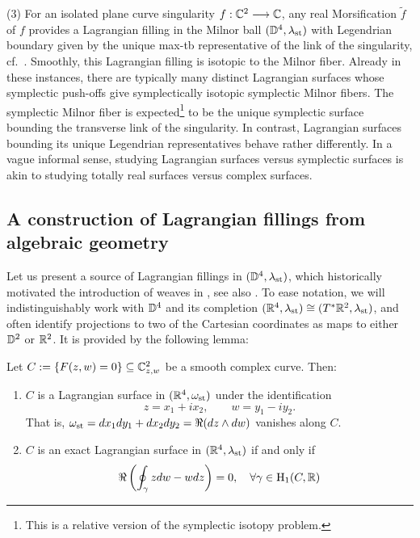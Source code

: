 \begin{example}
\noindent (3) For an isolated plane curve singularity $f:\mathbb{C}^2\longrightarrow\mathbb{C}$, any real Morsification $\tilde{f}$ of $f$ provides a Lagrangian filling in the Milnor ball $(\mathbb{D}^4,\lambda_{\text{st}})$ with Legendrian boundary given by the unique max-tb representative of the link of the singularity, cf.~\cite[Section 2]{CasalsLagSkel}. Smoothly, this Lagrangian filling is isotopic to the Milnor fiber. Already in these instances, there are typically many distinct Lagrangian surfaces whose symplectic push-offs give symplectically isotopic symplectic Milnor fibers. The symplectic Milnor fiber is expected\footnote{This is a relative version of the symplectic isotopy problem.} to be the unique symplectic surface bounding the transverse link of the singularity. In contrast, Lagrangian surfaces bounding its unique Legendrian representatives behave rather differently. In a vague informal sense, studying Lagrangian surfaces versus symplectic surfaces is akin to studying totally real surfaces versus complex surfaces.\sbs
\end{example}


\subsection{A construction of Lagrangian fillings from algebraic geometry}\label{ssec:Lagrangian_filling_from_AG} Let us present a source of Lagrangian fillings in $(\mathbb{D}^4,\lambda_{\text{st}})$, which historically motivated the introduction of weaves in \cite{CasalsZaslow}, see also \cite[Section 2]{TreuZas16}. To ease notation, we will indistinguishably work with $\mathbb{D}^4$ and its completion $(\mathbb{R}^4,\lambda_{\text{st}})\cong (T^*\mathbb{R}^2,\lambda_{\text{st}})$, and often identify projections to two of the Cartesian coordinates as maps to either $\mathbb{D}^2$ or $\mathbb{R}^2$. It is provided by the following lemma:

\begin{lemma}\label{lem:complex_curve_real_Lagrangian}
Let $C:=\{F(z,w)=0\}\subseteq\mathbb{C}^2_{z,w}$ be a smooth complex curve. Then:
\begin{enumerate}[label=$(\roman*)$]
    \item $C$ is a Lagrangian surface in $(\mathbb{R}^4,\omega_{\text{st}})$ under the identification
$$z=x_1+ix_2,\qquad w=y_1-iy_2.$$
That is, $\omega_{\text{st}}=dx_1dy_1+dx_2dy_2=\Re(dz\wedge dw)$ vanishes along $C$.\\

\item $C$ is an exact Lagrangian surface in $(\mathbb{R}^4,\lambda_{\text{st}})$ if and only if 
   \begin{equation}\label{eq:lambda_periods}
   \Re\left(\oint_\gamma zdw-wdz\right)=0,\quad \forall\gamma\in \operatorname{H}_1(C,\mathbb{R})
   \end{equation}
\end{enumerate}
\sbs
\end{lemma}


